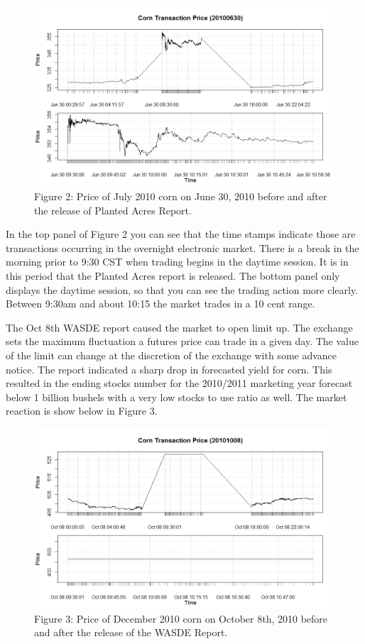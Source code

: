 \documentclass[]{book}
\theoremstyle{definition}
\theoremstyle{definition}
\theoremstyle{remark}
\begin{document}
\begin{figure}[htbp]
\centering
\includegraphics{images/100630.png}
\caption{Figure 2: Price of July 2010 corn on June 30, 2010 before and
after the release of Planted Acres Report.}
\end{figure}

In the top panel of Figure 2 you can see that the time stamps indicate
those are transactions occurring in the overnight electronic market.
There is a break in the morning prior to 9:30 CST when trading begins in
the daytime session. It is in this period that the Planted Acres report
is released. The bottom panel only displays the daytime session, so that
you can see the trading action more clearly. Between 9:30am and about
10:15 the market trades in a 10 cent range.

The Oct 8th WASDE report caused the market to open limit up. The
exchange sets the maximum fluctuation a futures price can trade in a
given day. The value of the limit can change at the discretion of the
exchange with some advance notice. The report indicated a sharp drop in
forecasted yield for corn. This resulted in the ending stocks number for
the 2010/2011 marketing year forecast below 1 billion bushels with a
very low stocks to use ratio as well. The market reaction is show below
in Figure 3.

\begin{figure}[htbp]
\centering
\includegraphics{images/101008.png}
\caption{Figure 3: Price of December 2010 corn on October 8th, 2010
before and after the release of the WASDE Report.}
\end{figure}
\end{document}
